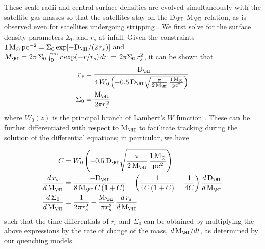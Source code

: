 These scale radii and central surface densities are evolved simultaneously with the satellite gas masses so that the satellites stay on the D$_\HI$-M$_\HI$ relation, as is observed even for satellites undergoing stripping \citep{Stevens2019,Naluminsa2021}. We first solve for the surface density parameters $\Sigma_0$ and $r_s$ at infall. Given the constraints $1 \, \text{M}_\odot \, \text{pc}^{-2} = \Sigma_0 \, \text{exp}[-\text{D}_{\HI}/(2 \, r_s)]$ and $M_{\HI} = 2\pi \, \Sigma_0 \int_0^\infty  r \, \text{exp}(-r/r_s) \, dr \, = \, 2 \pi \Sigma_0 \, r_s^2$, it can be shown that    
\begin{equation}
    \begin{aligned}
        r_s &= \frac{-\text{D}_{\HI}}{4 \, W_0\left(-0.5 \, \text{D}_{\HI} \sqrt{\frac{\pi}{2 \, \text{M}_{\HI}} \, \frac{1 \, \text{M}_\odot}{\text{pc}^2}} \right)} \\
        \Sigma_0 &= \frac{\text{M}_{\HI}}{2\pi r_s^2} \\
    \end{aligned}
\end{equation}
where $W_0(z)$ is the principal branch of Lambert's $W$ function \citep[e.g.,][]{Corless1996}. These can be further differentiated with respect to M$_{\HI}$ to facilitate tracking during the solution of the differential equations; in particular, we have 

\begin{equation} \label{equation:lambertdiff}
    \begin{aligned}
      C &= W_0\left(-0.5 \, \text{D}_{\HI} \sqrt{\frac{\pi}{2 \, \text{M}_{\HI}} \, \frac{1 \, \text{M}_\odot}{\text{pc}^2}} \right) \\
      \frac{d \, r_s}{d \, \text{M}_{\HI}} &= \frac{-\text{D}_{\HI}}{8 \, \text{M}_{\HI} \, C \, (1+C)} + \left( \frac{1}{4C \, (1+C)} - \frac{1}{4C} \right) \frac{d \, \text{D}_{\HI}}{d \, \text{M}_{\HI}} \\
      \frac{d \, \Sigma_0}{d \, \text{M}_{\HI}} &= \frac{1}{2\pi r_s^2} - \frac{\text{M}_{\HI}}{\pi r_s^3} \, \frac{d \, r_s}{d \, \text{M}_{\HI}}
    \end{aligned}
\end{equation}
such that the time differentials of $r_s$ and $\Sigma_0$ can be obtained by multiplying the above expressions by the rate of change of the \HI mass, $d \, \text{M}_{\HI} / dt$, as determined by our quenching models.\par

